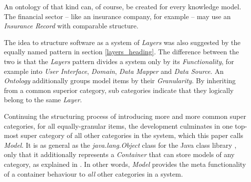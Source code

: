 An ontology of that kind can, of course, be created for every knowledge model.
The financial sector -- like an insurance company, for example -- may use an
\emph{Insurance Record} with comparable structure.

The idea to structure software as a system of \emph{Layers} was also suggested
by the equally named pattern in section \ref{layers_heading}. The difference
between the two is that the \emph{Layers} pattern divides a system only by its
\emph{Functionality}, for example into \emph{User Interface}, \emph{Domain},
\emph{Data Mapper} and \emph{Data Source}. An \emph{Ontology} additionally
groups model items by their \emph{Granularity}. By inheriting from a common
superior category, sub categories indicate that they logically belong to the
same \emph{Layer}.

Continuing the structuring process of introducing more and more common super
categories, for all equally-granular items, the development culminates in one
top-most super category of all other categories in the system, which this paper
calls \emph{Model}. It is as general as the \emph{java.lang.Object} class for
the Java class library \cite{java}, only that it additionally represents a
\emph{Container} that can store models of any category, as explained in
\cite{hellerbohl}. In other words, \emph{Model} provides the meta functionality
of a container behaviour to \emph{all} other categories in a system.
